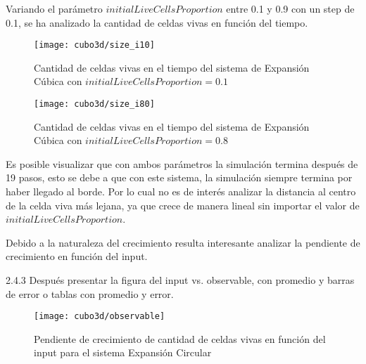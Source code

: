 Variando el parámetro $initialLiveCellsProportion$ entre 0.1 y 0.9 con un step de 0.1, se ha analizado la cantidad de celdas vivas en función
del tiempo.

\begin{figure}[H]
    \centering
    \texttt{[image: cubo3d/size\_i10]}
    \caption{Cantidad de celdas vivas en el tiempo del sistema de Expansión Cúbica con $initialLiveCellsProportion = 0.1$}
    \label{fig:cubo3d_i10}
\end{figure}
\begin{figure}[H]
    \centering
    \texttt{[image: cubo3d/size\_i80]}
    \caption{Cantidad de celdas vivas en el tiempo del sistema de Expansión Cúbica con $initialLiveCellsProportion = 0.8$}
    \label{fig:cubo3d_i80}
\end{figure}


Es posible visualizar que con ambos parámetros la simulación termina después de 19 pasos, esto se debe a que con este sistema, la simulación
siempre termina por haber llegado al borde. Por lo cual no es de interés analizar la distancia al centro de la celda viva más lejana, ya que
crece de manera lineal sin importar el valor de $initialLiveCellsProportion$.

Debido a la naturaleza del crecimiento resulta interesante analizar la pendiente de crecimiento en función del input.

2.4.3 Después presentar la figura del input vs. observable, con promedio y barras de error o tablas 
con promedio y error. 


\begin{figure}[H]
    \centering
    \texttt{[image: cubo3d/observable]}
    \caption{Pendiente de crecimiento de cantidad de celdas vivas en función del input para el sistema Expansión Circular}
    \label{fig:cubo3d_observable}
\end{figure}

